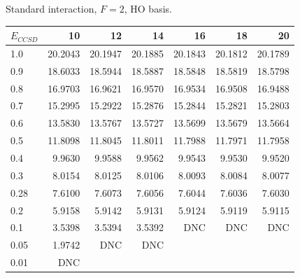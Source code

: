 \begin{table}
\begin{center}
Standard interaction, $F=2$, HO basis.\\
\begin{tabular}{l|rrrrrr}
\hline 
$E_{CCSD}$ & 10 & 12 & 14 & 16 & 18 & 20 \\
\hline \hline
1.0 & 20.2043 & 20.1947 & 20.1885 & 20.1843 & 20.1812 & 20.1789  \\ 
0.9 & 18.6033 & 18.5944 & 18.5887 & 18.5848 & 18.5819 & 18.5798  \\ 
0.8 & 16.9703 & 16.9621 & 16.9570 & 16.9534 & 16.9508 & 16.9488  \\ 
0.7 & 15.2995 & 15.2922 & 15.2876 & 15.2844 & 15.2821 & 15.2803  \\ 
0.6 & 13.5830 & 13.5767 & 13.5727 & 13.5699 & 13.5679 & 13.5664  \\ 
0.5 & 11.8098 & 11.8045 & 11.8011 & 11.7988 & 11.7971 & 11.7958  \\ 
0.4 & 9.9630 & 9.9588 & 9.9562 & 9.9543 & 9.9530 & 9.9520  \\ 
0.3 & 8.0154 & 8.0125 & 8.0106 & 8.0093 & 8.0084 & 8.0077  \\ 
0.28 & 7.6100 & 7.6073 & 7.6056 & 7.6044 & 7.6036 & 7.6030  \\ 
0.2 & 5.9158 & 5.9142 & 5.9131 & 5.9124 & 5.9119 & 5.9115  \\ 
0.1 & 3.5398 & 3.5394 & 3.5392 & DNC & DNC & DNC  \\ 
0.05 & 1.9742 & DNC & DNC  \\ 
0.01 & DNC  \\ 
\hline \hline
\end{tabular}
\end{center}
\end{table}

